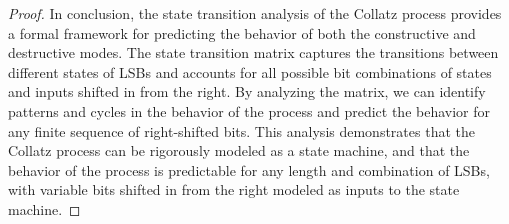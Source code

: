 \documentclass{article}
\theoremstyle{definition}
\begin{document}
\begin{proof}
In conclusion, the state transition analysis of the Collatz process provides a formal framework for predicting the behavior of both the constructive and destructive modes. The state transition matrix captures the transitions between different states of LSBs and accounts for all possible bit combinations of states and inputs shifted in from the right. By analyzing the matrix, we can identify patterns and cycles in the behavior of the process and predict the behavior for any finite sequence of right-shifted bits. This analysis demonstrates that the Collatz process can be rigorously modeled as a state machine, and that the behavior of the process is predictable for any length and combination of LSBs, with variable bits shifted in from the right modeled as inputs to the state machine.
\end{proof}
\end{document}
